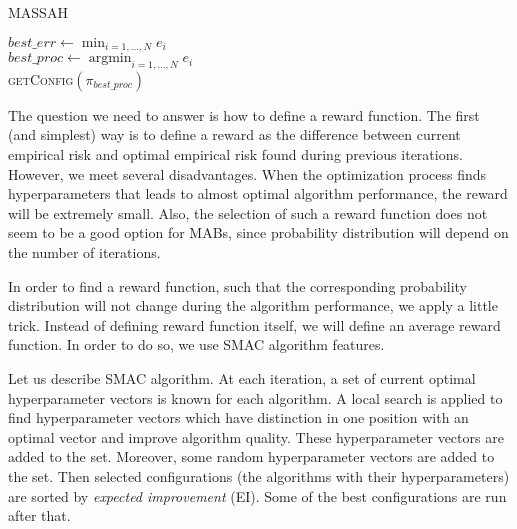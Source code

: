 \documentclass{svproc}
\DeclareMathOperator*{\argmin}{argmin}
\begin{document}
\begin{algorithm}[t]
  \caption{MASSAH}\label{alg:massah}
    \BlankLine
    $best\_err \gets \min_{i=1,\ldots,N} e_i$\\
    $best\_proc \gets \argmin_{i=1,\ldots,N} e_i$\\
    \Return \textsc{getConfig}$(\pi_{best\_proc})$
\end{algorithm}

The question we need to answer is how to define a reward function. The first (and simplest) way is to define a reward as the difference between current empirical risk and optimal empirical risk found during previous iterations. However, we meet several disadvantages. When the optimization process finds hyperparameters that leads to almost optimal algorithm performance, the reward will be extremely small. Also, the selection of such a reward function does not seem to be a good option for MABs, since probability distribution will depend on the number of iterations.

In order to find a reward function, such that the corresponding probability distribution will not change during the algorithm performance, we apply a little trick. Instead of defining reward function itself, we will define an average reward function. In order to do so, we use SMAC algorithm features.

Let us describe SMAC algorithm. At each iteration, a set of current optimal hyperparameter vectors is known for each algorithm. A local search is applied to find hyperparameter vectors which have distinction in one position with an optimal vector and improve algorithm quality. These hyperparameter vectors are added to the set. Moreover, some random hyperparameter vectors are added to the set. Then selected configurations (the algorithms with their hyperparameters) are sorted by \emph{expected improvement} (EI). Some of the best configurations are run after that.
\end{document}

